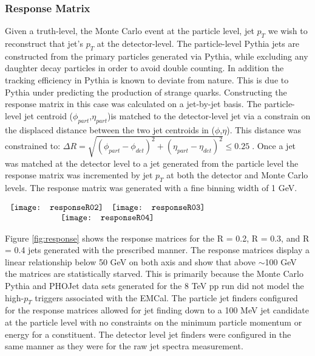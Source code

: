 \subsubsection{Response Matrix}
Given a truth-level, the Monte Carlo event at the particle level, jet $p_{T}$ we wish to reconstruct that jet's $p_{T}$ at the detector-level.  The particle-level Pythia jets are constructed from the primary particles generated via Pythia, while excluding any daughter decay particles in order to avoid double counting.  In addition the tracking efficiency in Pythia is known to deviate from nature.  This is due to Pythia under predicting the production of strange quarks.  
Constructing the response matrix in this case was calculated on a jet-by-jet basis.  The particle-level jet centroid ($\phi_{part}$,$\eta_{part}$)is matched to the detector-level jet via a constrain on the displaced distance between the two jet centroids in ($\phi$,$\eta$).  This distance was constrained to: $\Delta  R = \sqrt{(\phi_{part} - \phi_{det})^{2} + (\eta_{part} - \eta_{det})^{2}} \leq 0.25 \; $.  Once a jet was matched at the detector level to a jet generated from the particle level the response matrix was incremented by jet $p_{T}$ at both the detector and Monte Carlo levels.  The response matrix was generated with a fine binning width of 1 GeV. 

\begin{figure*}[t!]
$\begin{array}{rl}
    \texttt{[image: responseR02]} &
    \texttt{[image: responseR03]}\\
    \multicolumn{2}{c}{\texttt{[image: responseR04]}}
\end{array}$
\caption[Response Matrices for R = 0.2, R=0.3, and R = 0.4 jets.]{\label{fig:response}Response Matrices for R = 0.2, R=0.3, and R = 0.4 jets.}
\end{figure*}

Figure \ref{fig:response} shows the response matrices for the R = 0.2, R = 0.3, and R = 0.4 jets generated with the prescribed manner.  The response matrices display a linear relationship below 50 GeV on both axis and show that above $\sim$100 GeV the matrices are statistically starved.  This is primarily because the Monte Carlo Pythia and PHOJet data sets generated for the 8 TeV pp run did not model the high-$p_{T}$ triggers associated with the EMCal.  The particle jet finders configured for the response matrices allowed for jet finding down to a 100 MeV jet candidate at the particle level with no constraints on the minimum particle momentum or energy for a constituent.  The detector level jet finders were configured in the same manner as they were for the raw jet spectra measurement.  

